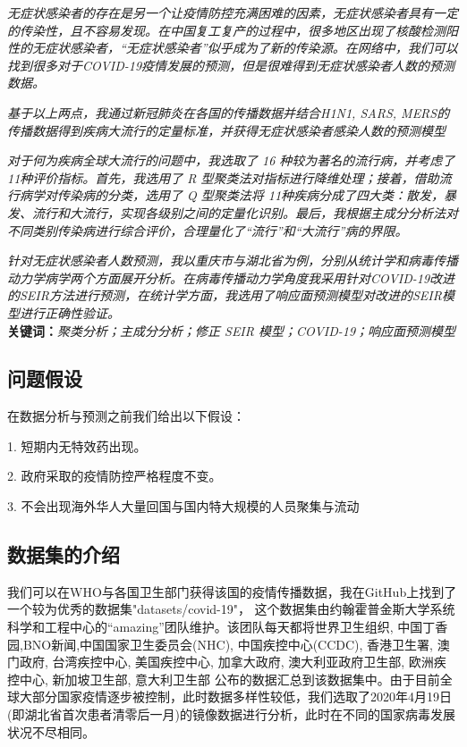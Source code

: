 \documentclass[a4paper, 11pt,twoside=true,UTF8]{scrartcl}
\begin{document}
\textit{无症状感染者的存在是另一个让疫情防控充满困难的因素，无症状感染者具有一定的传染性，且不容易发现。在中国复工复产的过程中，很多地区出现了核酸检测阳性的无症状感染者，“无症状感染者”似乎成为了新的传染源。在网络中，我们可以找到很多对于COVID-19疫情发展的预测，但是很难得到无症状感染者人数的预测数据。}

\textit{基于以上两点，我通过新冠肺炎在各国的传播数据并结合H1N1, SARS, MERS的传播数据得到疾病大流行的定量标准，并获得无症状感染者感染人数的预测模型}

\textit{对于何为疾病全球大流行的问题中，我选取了 16 种较为著名的流行病，并考虑了11种评价指标。首先，我选用了 R 型聚类法对指标进行降维处理；接着，借助流行病学对传染病的分类，选用了 Q 型聚类法将 11种疾病分成了四大类：散发，暴发、流行和大流行，实现各级别之间的定量化识别。最后，我根据主成分分析法对不同类别传染病进行综合评价，合理量化了“流行”和“大流行”病的界限。}

\textit{针对无症状感染者人数预测，我以重庆市与湖北省为例，分别从统计学和病毒传播动力学病学两个方面展开分析。在病毒传播动力学角度我采用针对COVID-19改进的SEIR方法进行预测，在统计学方面，我选用了响应面预测模型对改进的SEIR模型进行正确性验证。}
\\
\textbf{关键词：}\textit{聚类分析；主成分分析；修正 SEIR 模型；COVID-19；响应面预测模型}\\

\newpage
\subsection{问题假设}
\qquad 在数据分析与预测之前我们给出以下假设：

1. 短期内无特效药出现。

2. 政府采取的疫情防控严格程度不变。

3. 不会出现海外华人大量回国与国内特大规模的人员聚集与流动

\subsection{数据集的介绍}
\qquad 我们可以在WHO与各国卫生部门获得该国的疫情传播数据，我在GitHub上找到了一个较为优秀的数据集"datasets/covid-19"， 这个数据集由约翰霍普金斯大学系统科学和工程中心的“amazing”团队维护。该团队每天都将世界卫生组织, 中国丁香园,BNO新闻,中国国家卫生委员会(NHC), 中国疾控中心(CCDC), 香港卫生署, 澳门政府, 台湾疾控中心, 美国疾控中心, 加拿大政府, 澳大利亚政府卫生部, 欧洲疾控中心, 新加坡卫生部, 意大利卫生部 公布的数据汇总到该数据集中。由于目前全球大部分国家疫情逐步被控制，此时数据多样性较低，我们选取了2020年4月19日(即湖北省首次患者清零后一月)的镜像数据进行分析，此时在不同的国家病毒发展状况不尽相同。
\end{document}
